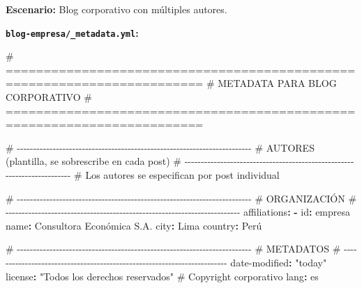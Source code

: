 \documentclass[
  doc,
  floatsintext,
  longtable,
  a4paper,
  nolmodern,
  notxfonts,
  notimes,
  12pt,
  colorlinks=true,linkcolor=blue,citecolor=blue,urlcolor=blue]{apa7}
\newenvironment{Shaded}{\begin{snugshade}}{\end{snugshade}}
\newcommand{\AttributeTok}[1]{\textcolor[rgb]{0.40,0.45,0.13}{#1}}
\newcommand{\CommentTok}[1]{\textcolor[rgb]{0.37,0.37,0.37}{#1}}
\newcommand{\FunctionTok}[1]{\textcolor[rgb]{0.28,0.35,0.67}{#1}}
\newcommand{\KeywordTok}[1]{\textcolor[rgb]{0.00,0.23,0.31}{\textbf{#1}}}
\newcommand{\StringTok}[1]{\textcolor[rgb]{0.13,0.47,0.30}{#1}}
\begin{document}
\textbf{Escenario:} Blog corporativo con múltiples autores.

\textbf{\texttt{blog-empresa/\_metadata.yml}:}

\begin{Shaded}
\begin{Highlighting}[]
\CommentTok{\# ========================================================================}
\CommentTok{\# METADATA PARA BLOG CORPORATIVO}
\CommentTok{\# ========================================================================}

\CommentTok{\# {-}{-}{-}{-}{-}{-}{-}{-}{-}{-}{-}{-}{-}{-}{-}{-}{-}{-}{-}{-}{-}{-}{-}{-}{-}{-}{-}{-}{-}{-}{-}{-}{-}{-}{-}{-}{-}{-}{-}{-}{-}{-}{-}{-}{-}{-}{-}{-}{-}{-}{-}{-}{-}{-}{-}{-}{-}{-}{-}{-}{-}{-}{-}{-}{-}{-}{-}{-}{-}{-}{-}{-}}
\CommentTok{\# AUTORES (plantilla, se sobrescribe en cada post)}
\CommentTok{\# {-}{-}{-}{-}{-}{-}{-}{-}{-}{-}{-}{-}{-}{-}{-}{-}{-}{-}{-}{-}{-}{-}{-}{-}{-}{-}{-}{-}{-}{-}{-}{-}{-}{-}{-}{-}{-}{-}{-}{-}{-}{-}{-}{-}{-}{-}{-}{-}{-}{-}{-}{-}{-}{-}{-}{-}{-}{-}{-}{-}{-}{-}{-}{-}{-}{-}{-}{-}{-}{-}{-}{-}}
\CommentTok{\# Los autores se especifican por post individual}

\CommentTok{\# {-}{-}{-}{-}{-}{-}{-}{-}{-}{-}{-}{-}{-}{-}{-}{-}{-}{-}{-}{-}{-}{-}{-}{-}{-}{-}{-}{-}{-}{-}{-}{-}{-}{-}{-}{-}{-}{-}{-}{-}{-}{-}{-}{-}{-}{-}{-}{-}{-}{-}{-}{-}{-}{-}{-}{-}{-}{-}{-}{-}{-}{-}{-}{-}{-}{-}{-}{-}{-}{-}{-}{-}}
\CommentTok{\# ORGANIZACIÓN}
\CommentTok{\# {-}{-}{-}{-}{-}{-}{-}{-}{-}{-}{-}{-}{-}{-}{-}{-}{-}{-}{-}{-}{-}{-}{-}{-}{-}{-}{-}{-}{-}{-}{-}{-}{-}{-}{-}{-}{-}{-}{-}{-}{-}{-}{-}{-}{-}{-}{-}{-}{-}{-}{-}{-}{-}{-}{-}{-}{-}{-}{-}{-}{-}{-}{-}{-}{-}{-}{-}{-}{-}{-}{-}{-}}
\FunctionTok{affiliations}\KeywordTok{:}
\AttributeTok{  }\KeywordTok{{-}}\AttributeTok{ }\FunctionTok{id}\KeywordTok{:}\AttributeTok{ empresa}
\AttributeTok{    }\FunctionTok{name}\KeywordTok{:}\AttributeTok{ Consultora Económica S.A.}
\AttributeTok{    }\FunctionTok{city}\KeywordTok{:}\AttributeTok{ Lima}
\AttributeTok{    }\FunctionTok{country}\KeywordTok{:}\AttributeTok{ Perú}

\CommentTok{\# {-}{-}{-}{-}{-}{-}{-}{-}{-}{-}{-}{-}{-}{-}{-}{-}{-}{-}{-}{-}{-}{-}{-}{-}{-}{-}{-}{-}{-}{-}{-}{-}{-}{-}{-}{-}{-}{-}{-}{-}{-}{-}{-}{-}{-}{-}{-}{-}{-}{-}{-}{-}{-}{-}{-}{-}{-}{-}{-}{-}{-}{-}{-}{-}{-}{-}{-}{-}{-}{-}{-}{-}}
\CommentTok{\# METADATOS}
\CommentTok{\# {-}{-}{-}{-}{-}{-}{-}{-}{-}{-}{-}{-}{-}{-}{-}{-}{-}{-}{-}{-}{-}{-}{-}{-}{-}{-}{-}{-}{-}{-}{-}{-}{-}{-}{-}{-}{-}{-}{-}{-}{-}{-}{-}{-}{-}{-}{-}{-}{-}{-}{-}{-}{-}{-}{-}{-}{-}{-}{-}{-}{-}{-}{-}{-}{-}{-}{-}{-}{-}{-}{-}{-}}
\FunctionTok{date{-}modified}\KeywordTok{:}\AttributeTok{ }\StringTok{"today"}
\FunctionTok{license}\KeywordTok{:}\AttributeTok{ }\StringTok{"Todos los derechos reservados"}\CommentTok{  \# Copyright corporativo}
\FunctionTok{lang}\KeywordTok{:}\AttributeTok{ es}


\end{Highlighting}
\end{Shaded}
\end{document}
